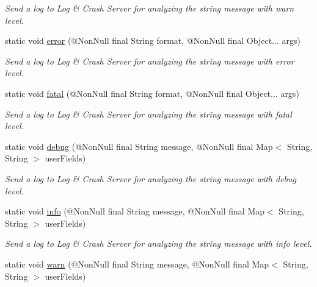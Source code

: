 \begin{DoxyCompactItemize}
\begin{DoxyCompactList}\small\item\em Send a log to Log \& Crash Server for analyzing the string message with warn level. \end{DoxyCompactList}\item 
static void \hyperlink{classcom_1_1toast_1_1android_1_1gamebase_1_1_gamebase_1_1_logger_a1215d6d113ed5727c1a8c4499df8f319}{error} (@Non\+Null final String format, @Non\+Null final Object... args)
\begin{DoxyCompactList}\small\item\em Send a log to Log \& Crash Server for analyzing the string message with error level. \end{DoxyCompactList}\item 
static void \hyperlink{classcom_1_1toast_1_1android_1_1gamebase_1_1_gamebase_1_1_logger_afc5d2b7e19013fcd0baf573751179b8a}{fatal} (@Non\+Null final String format, @Non\+Null final Object... args)
\begin{DoxyCompactList}\small\item\em Send a log to Log \& Crash Server for analyzing the string message with fatal level. \end{DoxyCompactList}\item 
static void \hyperlink{classcom_1_1toast_1_1android_1_1gamebase_1_1_gamebase_1_1_logger_ae82c0cfc5bedaf421e35af61064f520e}{debug} (@Non\+Null final String message, @Non\+Null final Map$<$ String, String $>$ user\+Fields)
\begin{DoxyCompactList}\small\item\em Send a log to Log \& Crash Server for analyzing the string message with debug level. \end{DoxyCompactList}\item 
static void \hyperlink{classcom_1_1toast_1_1android_1_1gamebase_1_1_gamebase_1_1_logger_af925caa862e19cfcbd7e14e628b389a4}{info} (@Non\+Null final String message, @Non\+Null final Map$<$ String, String $>$ user\+Fields)
\begin{DoxyCompactList}\small\item\em Send a log to Log \& Crash Server for analyzing the string message with info level. \end{DoxyCompactList}\item 
static void \hyperlink{classcom_1_1toast_1_1android_1_1gamebase_1_1_gamebase_1_1_logger_a4bfdacb5e58257a0022619f2958c976c}{warn} (@Non\+Null final String message, @Non\+Null final Map$<$ String, String $>$ user\+Fields)

\end{DoxyCompactItemize}
